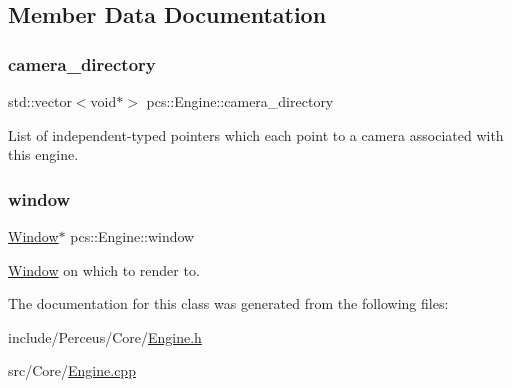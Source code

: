 \subsection{Member Data Documentation}
\mbox{\label{classpcs_1_1Engine_ad004e5859bca9815210a0f3786b83a02}} 
\subsubsection{\texorpdfstring{camera\+\_\+directory}{camera\_directory}}
{\footnotesize\ttfamily std\+::vector$<$void$\ast$$>$ pcs\+::\+Engine\+::camera\+\_\+directory\hspace{0.3cm}{\ttfamily [private]}}

List of independent-\/typed pointers which each point to a camera associated with this engine. \mbox{\label{classpcs_1_1Engine_a9d6dcbb93509389d86beb46ba33371a1}} 
\subsubsection{\texorpdfstring{window}{window}}
{\footnotesize\ttfamily \hyperlink{classpcs_1_1Window}{Window}$\ast$ pcs\+::\+Engine\+::window\hspace{0.3cm}{\ttfamily [private]}}



\hyperlink{classpcs_1_1Window}{Window} on which to render to. 



The documentation for this class was generated from the following files\+:\begin{DoxyCompactItemize}
\item 
include/\+Perceus/\+Core/\hyperlink{Engine_8h}{Engine.\+h}\item 
src/\+Core/\hyperlink{Engine_8cpp}{Engine.\+cpp}\end{DoxyCompactItemize}
